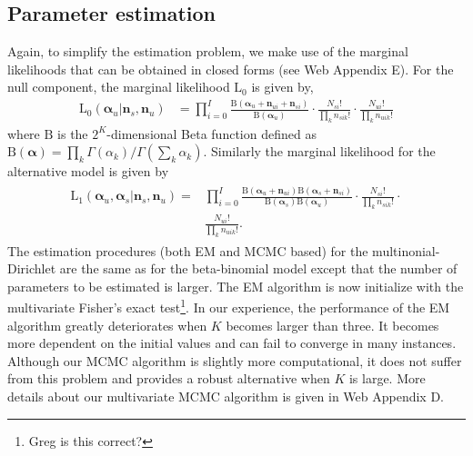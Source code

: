 \documentclass[useAMS,referee,usenatbib]{biom}
\begin{document}
\subsection{Parameter estimation}
Again, to simplify the estimation problem, we make use of the marginal likelihoods that can be obtained in closed forms (see Web Appendix E). For the null component, the marginal likelihood $\mathrm{L}_0$ is given by,
\begin{align*}
\mathrm{L}_0(\boldsymbol{\alpha}_u|\mathbf{n}_s,\mathbf{n}_u) &= \prod_{i=0}^I\frac{ \mathrm{B}(\boldsymbol{\alpha}_{u}+\mathbf{n}_{ui}+\mathbf{n}_{si})}{\mathrm{B}(\boldsymbol{\alpha}_u)} \cdot \frac{N_{si}!}{\prod_k n_{sik}!} \cdot \frac{N_{ui}!}{\prod_k n_{uik}!}
\end{align*}
where $\mathrm{B}$ is the $2^K$-dimensional Beta function defined as $\mathrm{B}(\boldsymbol{\alpha})=\prod_k\Gamma(\alpha_k)/\Gamma(\sum_k\alpha_k)$. Similarly the marginal likelihood for the alternative model is given by 
\begin{align*}
\begin{split}
\mathrm{L}_1(\boldsymbol{\alpha}_u,\boldsymbol{\alpha}_s|\mathbf{n}_s,\mathbf{n}_u) =& \prod_{i=0}^I\frac{\mathrm{B}(\boldsymbol{\alpha}_{u}+\mathbf{n}_{ui}) \mathrm{B}(\boldsymbol{\alpha}_{s}+\mathbf{n}_{si})}{\mathrm{B}(\boldsymbol{\alpha}_s)\mathrm{B}(\boldsymbol{\alpha}_u)} \cdot \frac{N_{si}!}{\prod_k n_{sik}!} \cdot \\ &\frac{N_{ui}!}{\prod_k n_{uik}!}.%
\end{split}
\end{align*}
The estimation procedures (both EM and MCMC based) for the multinonial-Dirichlet are the same as for the beta-binomial model except that the number of parameters to be estimated is larger. The EM algorithm is now initialize with the multivariate Fisher's exact test\footnote{Greg is this correct?}. In our experience, the performance of the EM algorithm greatly deteriorates when $K$ becomes larger than three. It becomes more dependent on the initial values and can fail to converge in many instances. Although our MCMC algorithm is slightly more computational, it does not suffer from this problem and provides a robust alternative when $K$ is large. More details about our multivariate MCMC algorithm is given in Web Appendix D. 
\end{document}

